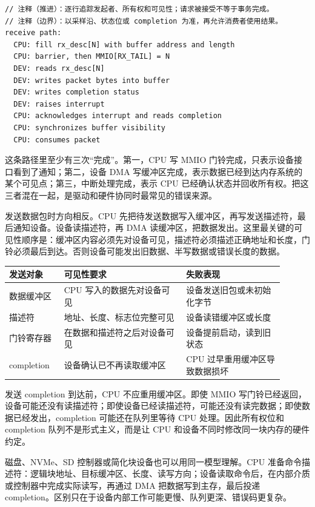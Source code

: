 \begin{lstlisting}
// 注释（推进）：逐行追踪发起者、所有权和可见性；请求被接受不等于事务完成。
// 注释（边界）：以采样沿、状态位或 completion 为准，再允许消费者使用结果。
receive path:
  CPU: fill rx_desc[N] with buffer address and length
  CPU: barrier, then MMIO[RX_TAIL] = N
  DEV: reads rx_desc[N]
  DEV: writes packet bytes into buffer
  DEV: writes completion status
  DEV: raises interrupt
  CPU: acknowledges interrupt and reads completion
  CPU: synchronizes buffer visibility
  CPU: consumes packet
\end{lstlisting}

这条路径里至少有三次“完成”。第一，CPU 写 MMIO 门铃完成，只表示设备接口看到了通知；第二，设备 DMA 写缓冲区完成，表示数据已经到达内存系统的某个可见点；第三，中断处理完成，表示 CPU 已经确认状态并回收所有权。把这三者混在一起，是驱动和硬件协同时最常见的错误来源。

发送数据包时方向相反。CPU 先把待发送数据写入缓冲区，再写发送描述符，最后通知设备。设备读描述符，再 DMA 读缓冲区，把数据发出。这里最关键的可见性顺序是：缓冲区内容必须先对设备可见，描述符必须描述正确地址和长度，门铃必须最后到达。否则设备可能发出旧数据、半写数据或错误长度的数据。

\begin{longtable}{L{0.18\linewidth}L{0.4\linewidth}L{0.32\linewidth}}
\toprule
发送对象 & 可见性要求 & 失败表现 \\
\midrule
数据缓冲区 & CPU 写入的数据先对设备可见 & 设备发送旧包或未初始化字节 \\\tablerowrule
描述符 & 地址、长度、标志位完整可见 & 设备读错缓冲区或长度 \\\tablerowrule
门铃寄存器 & 在数据和描述符之后对设备可见 & 设备提前启动，读到旧状态 \\\tablerowrule
completion & 设备确认已不再读取缓冲区 & CPU 过早重用缓冲区导致数据损坏 \\
\bottomrule
\end{longtable}

发送 completion 到达前，CPU 不应重用缓冲区。即使 MMIO 写门铃已经返回，设备可能还没有读描述符；即使设备已经读描述符，可能还没有读完数据；即使数据已经发出，completion 可能还在队列里等待 CPU 处理。因此所有权位和 completion 队列不是形式主义，而是让 CPU 和设备不同时修改同一块内存的硬件约定。

磁盘、NVMe、SD 控制器或简化块设备也可以用同一模型理解。CPU 准备命令描述符：逻辑块地址、目标缓冲区、长度、读写方向；设备读取命令后，在内部介质或控制器中完成实际读写，再通过 DMA 把数据写到主存，最后投递 completion。区别只在于设备内部工作可能更慢、队列更深、错误码更复杂。

